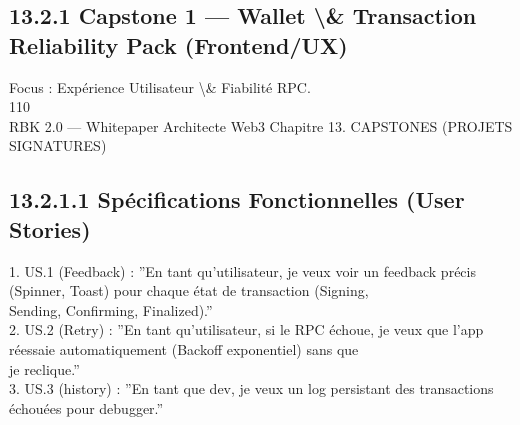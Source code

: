 \subsection{13.2.1 Capstone 1 — Wallet \textbackslash{}& Transaction Reliability Pack (Frontend/UX)}
Focus : Expérience Utilisateur \textbackslash{}& Fiabilité RPC.\\
\vspace{0.5em}
\vspace{0.5em}
\vspace{0.5em}
\vspace{0.5em}
110\\
RBK 2.0 — Whitepaper Architecte Web3                                                     Chapitre 13. CAPSTONES (PROJETS SIGNATURES)\\
\vspace{0.5em}
\vspace{0.5em}
\subsection{13.2.1.1 Spécifications Fonctionnelles (User Stories)}
\vspace{0.5em}
1. US.1 (Feedback) : ”En tant qu’utilisateur, je veux voir un feedback précis (Spinner, Toast) pour chaque état de transaction (Signing,\\
Sending, Confirming, Finalized).”\\
\vspace{0.5em}
2. US.2 (Retry) : ”En tant qu’utilisateur, si le RPC échoue, je veux que l’app réessaie automatiquement (Backoff exponentiel) sans que\\
je reclique.”\\
\vspace{0.5em}
3. US.3 (history) : ”En tant que dev, je veux un log persistant des transactions échouées pour debugger.”\\
\vspace{0.5em}
